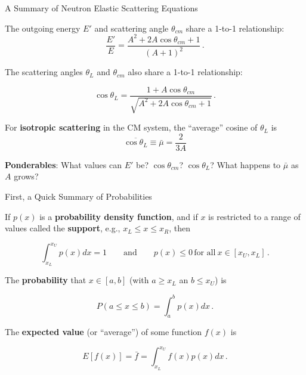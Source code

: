 \documentclass[aspectratio=1610]{beamer}
\begin{document}
\begin{frame}{A Summary of Neutron Elastic Scattering Equations}
 
The outgoing energy \(E'\) and scattering angle
\(\theta_{cm}\) share a 1-to-1 relationship: \[
\frac{E'}{E} = \frac{A^2 + 2A\cos{\theta_{cm}} + 1}{(A+1)^2} \, .
\tag{Rydin 2.18}
\]

The scattering angles \(\theta_L\) and
\(\theta_{cm}\) also share a 1-to-1 relationship:

\[
  \cos \theta_L = \frac{1+A\cos\theta_{cm}} {\sqrt{A^2 + 2A \cos \theta_{cm} + 1}} \, .
  \tag{Rydin 2.21}
\]

For {\bf isotropic scattering} in the CM system, the ``average'' cosine of
\(\theta_L\) is \[
   \overline{\cos{\theta}_L} \equiv \bar{\mu} = \frac{2}{3A} 
   \tag{Rydin 2.56}
\]

{\bf Ponderables}: What values can $E'$ be?  $\cos \theta_{cm}$?  $\cos \theta_L$?
What happens to $\bar{\mu}$ as $A$ grows?

\end{frame}



\begin{frame}{First, a Quick Summary of Probabilities}

If \(p(x)\) is a {\bf probability density function}, and if \(x\) is
restricted to a range of values called the {\bf support}, e.g.,
\(x_L \leq x \leq x_R\), then

\[
  \int^{x_U}_{x_L} p(x) dx = 1 \qquad \text{and} \qquad p(x) \leq 0 \, \text{for all}~x \in [x_U, x_L] \, .
\]

The {\bf probability} that \(x \in [a, b]\) (with \(a \geq x_L\) an
\(b \leq x_U\)) is

\[
 P(a \leq x \leq b) = \int^{b}_{a} p(x) dx \, .
\]

The {\bf expected value} (or ``average'') of some function \(f(x)\) is

\[
  E[f(x)] = \bar{f} =  \int^{x_U}_{x_L} f(x) p(x) dx \, .
\]


\end{frame}
\end{document}
